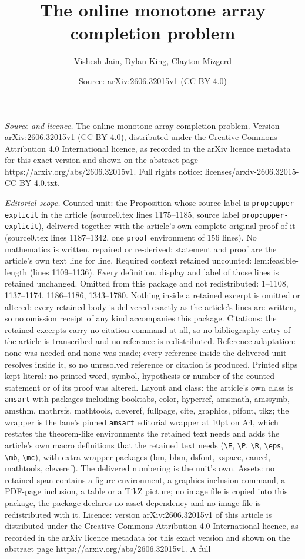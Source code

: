 \documentclass[10pt,a4paper]{amsart}
\title[The online monotone array completion problem]{The online monotone array completion problem}
\author{Vishesh Jain, Dylan King, Clayton Mizgerd}
\date{Source: arXiv:2606.32015v1 (CC BY 4.0)}
\begin{document}
\maketitle

\noindent\emph{Source and licence.} The online monotone array completion problem. Version arXiv:2606.32015v1 (CC BY 4.0), distributed under the Creative Commons Attribution 4.0 International licence, as recorded in the arXiv licence metadata for this exact version and shown on the abstract page https://arxiv.org/abs/2606.32015v1. Full rights notice: licenses/arxiv-2606.32015-CC-BY-4.0.txt.\par\smallskip

\noindent\textit{Editorial scope.} Counted unit: the Proposition whose source label is \texttt{prop:upper-explicit} in the article (source0.tex lines 1175--1185, source label \texttt{prop:upper-explicit}), delivered together with the article's own complete original proof of it (source0.tex lines 1187--1342, one \texttt{proof} environment of 156 lines). No mathematics is written, repaired or re-derived: statement and proof are the article's own text line for line. Required context retained uncounted: lem:feasible-length (lines 1109--1136). Every definition, display and label of those lines is retained unchanged. Omitted from this package and not redistributed: 1--1108, 1137--1174, 1186--1186, 1343--1780. Nothing inside a retained excerpt is omitted or altered: every retained body is delivered exactly as the article's lines are written, so no omission receipt of any kind accompanies this package. Citations: the retained excerpts carry no citation command at all, so no bibliography entry of the article is transcribed and no reference is redistributed. Reference adaptation: none was needed and none was made; every reference inside the delivered unit resolves inside it, so no unresolved reference or citation is produced. Printed slips kept literal: no printed word, symbol, hypothesis or number of the counted statement or of its proof was altered. Layout and class: the article's own class is \texttt{amsart} with packages including booktabs, color, hyperref, amsmath, amssymb, amsthm, mathrsfs, mathtools, cleveref, fullpage, cite, graphics, pifont, tikz; the wrapper is the lane's pinned \texttt{amsart} editorial wrapper at 10pt on A4, which restates the theorem-like environments the retained text needs and adds the article's own macro definitions that the retained text needs (\texttt{\textbackslash E}, \texttt{\textbackslash P}, \texttt{\textbackslash R}, \texttt{\textbackslash eps}, \texttt{\textbackslash mb}, \texttt{\textbackslash mc}), with extra wrapper packages (bm, bbm, dsfont, xspace, cancel, mathtools, cleveref). The delivered numbering is the unit's own. Assets: no retained span contains a figure environment, a graphics-inclusion command, a PDF-page inclusion, a table or a TikZ picture; no image file is copied into this package, the package declares no asset dependency and no image file is redistributed with it. Licence: version arXiv:2606.32015v1 of this article is distributed under the Creative Commons Attribution 4.0 International licence, as recorded in the arXiv licence metadata for this exact version and shown on the abstract page https://arxiv.org/abs/2606.32015v1. A full 
\end{document}
